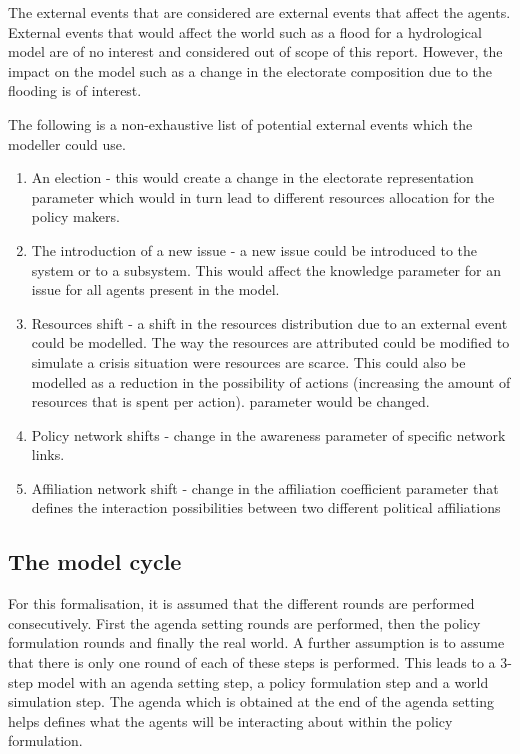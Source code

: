The external events that are considered are external events that affect the agents. External events that would affect the world such as a flood for a hydrological model are of no interest and considered out of scope of this report. However, the impact on the model such as a change in the electorate composition due to the flooding is of interest.

The following is a non-exhaustive list of potential external events which the modeller could use.

\begin{enumerate}
\item An election - this would create a change in the electorate representation parameter which would in turn lead to different resources allocation for the policy makers.
\item The introduction of a new issue - a new issue could be introduced to the system or to a subsystem. This would affect the knowledge parameter for an issue for all agents present in the model.
\item Resources shift - a shift in the resources distribution due to an external event could be modelled. The way the resources are attributed could be modified to simulate a crisis situation were resources are scarce. This could also be modelled as a reduction in the possibility of actions (increasing the amount of resources that is spent per action).
parameter would be changed.
\item Policy network shifts - change in the awareness parameter of specific network links.
\item Affiliation network shift - change in the affiliation coefficient parameter that defines the interaction possibilities between two different political affiliations
\end{enumerate}

\subsection{The model cycle}

For this formalisation, it is assumed that the different rounds are performed consecutively. First the agenda setting rounds are performed, then the policy formulation rounds and finally the real world. A further assumption is to assume that there is only one round of each of these steps is performed. This leads to a 3-step model with an agenda setting step, a policy formulation step and a world simulation step. The agenda which is obtained at the end of the agenda setting helps defines what the agents will be interacting about within the policy formulation.

